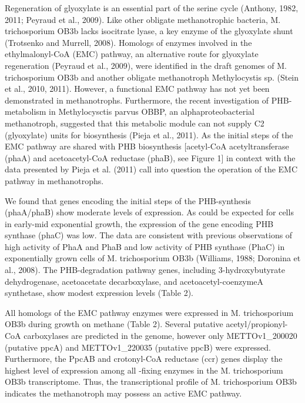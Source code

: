 
Regeneration of glyoxylate is an essential part of the serine cycle (Anthony, 1982, 2011; Peyraud et al., 2009).
Like other obligate methanotrophic bacteria, M. trichosporium OB3b lacks isocitrate lyase, a key enzyme of the glyoxylate shunt (Trotsenko and Murrell, 2008).
Homologs of enzymes involved in the ethylmalonyl-CoA (EMC) pathway, an alternative route for glyoxylate regeneration (Peyraud et al., 2009), were identified in the draft genomes of M. trichosporium OB3b and another obligate methanotroph Methylocystis sp. (Stein et al., 2010, 2011).
However, a functional EMC pathway has not yet been demonstrated in methanotrophs.
Furthermore, the recent investigation of PHB-metabolism in Methylocysctis parvus OBBP, an alphaproteobacterial methanotroph, suggested that this metabolic module can not supply C2 (glyoxylate) units for biosynthesis (Pieja et al., 2011).
As the initial steps of the EMC pathway are shared with PHB biosynthesis [acetyl-CoA acetyltransferase (phaA) and acetoacetyl-CoA reductase (phaB), see Figure 1] in context with the data presented by Pieja et al. (2011) call into question the operation of the EMC pathway in methanotrophs.

We found that genes encoding the initial steps of the PHB-synthesis (phaA/phaB) show moderate levels of expression.
As could be expected for cells in early-mid exponential growth, the expression of the gene encoding PHB synthase (phaC) was low.
The data are consistent with previous observations of high activity of PhaA and PhaB and low activity of PHB synthase (PhaC) in exponentially grown cells of M. trichosporium OB3b (Williams, 1988; Doronina et al., 2008).
The PHB-degradation pathway genes, including 3-hydroxybutyrate dehydrogenase, acetoacetate decarboxylase, and acetoacetyl-coenzymeA synthetase, show modest expression levels (Table 2).

All homologs of the EMC pathway enzymes were expressed in M. trichosporium OB3b during growth on methane (Table 2).
Several putative acetyl/propionyl-CoA carboxylases are predicted in the genome, however only METTOv1\_200020 (putative ppcA) and METTOv1\_220035 (putative ppcB) were expressed.
Furthermore, the PpcAB and crotonyl-CoA reductase (ccr) genes display the highest level of expression among all -fixing enzymes in the M. trichosporium OB3b transcriptome.
Thus, the transcriptional profile of M. trichosporium OB3b indicates the methanotroph may possess an active EMC pathway.

